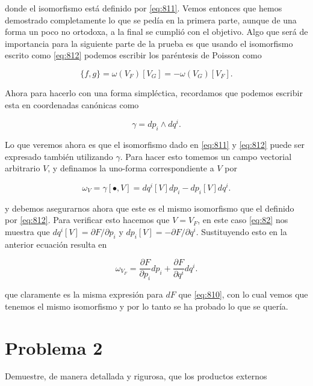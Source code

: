 \documentclass[a4paper,10pt]{article}
\numberwithin{equation}{section}
\begin{document}
donde el isomorfismo está definido por \eqref{eq:811}. Vemos entonces que hemos demostrado 
completamente lo que se pedía en la primera parte, aunque de una forma un poco no ortodoxa, 
a la final se cumplió con el objetivo. Algo que será de importancia para la siguiente 
parte de la prueba es que usando el isomorfismo escrito como \eqref{eq:812} podemos 
escribir los paréntesis de Poisson como \cite{rasband}

\begin{equation}
 \{f,g\} = \omega(V_F)[V_G] = - \omega(V_G)[V_F].
\end{equation}

Ahora para hacerlo con una forma simpléctica, recordamos que podemos escribir esta 
en coordenadas canónicas como

\begin{equation}
 \gamma = dp_i \wedge dq^i.
\end{equation}

Lo que veremos ahora es que el isomorfismo dado en \eqref{eq:811} y \eqref{eq:812} puede 
ser expresado también utilizando $\gamma$. Para hacer esto tomemos un campo vectorial 
arbitrario $V$, y definamos la uno-forma correspondiente a $V$ por 

\begin{equation}
 \omega_V = \gamma[\bullet,V] = dq^i[V]dp_i - dp_i[V]dq^i.
\end{equation}

y debemos asegurarnos ahora que este es el mismo isomorfismo que el definido por \eqref{eq:812}. Para 
verificar esto hacemos que $V = V_F$, en este caso \eqref{eq:82} nos muestra que 
$dq^i[V] = \partial F/ \partial p_i$ y $dp_i[V] = - \partial F/\partial q^i$. Sustituyendo 
esto en la anterior ecuación resulta en 

\begin{equation}
 \omega_{V_F} = \frac{\partial F}{\partial p_i}dp_i + \frac{\partial F}{\partial q^i}dq^i.
\end{equation}

que claramente es la misma expresión para $dF$ que \eqref{eq:810}, con lo cual vemos que 
tenemos el mismo isomorfismo y por lo tanto se ha probado lo que se quería.


\section{Problema 2}

Demuestre, de manera detallada y rigurosa, que los productos externos 
\end{document}
